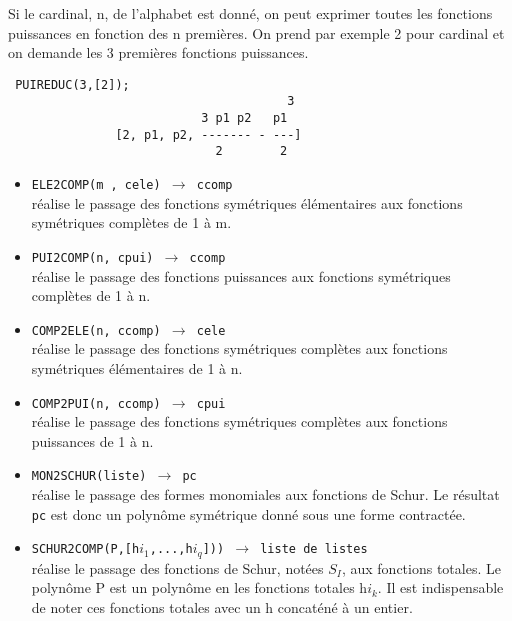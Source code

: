Si le cardinal, n, de l'alphabet est donn\'{e}, on peut
exprimer toutes les fonctions puissances en fonction des n premi\`{e}res.
On prend par exemple 2 pour cardinal et on demande les 3 premi\`{e}res
fonctions puissances.
\small
\begin{verbatim}
 PUIREDUC(3,[2]);
                                       3
                           3 p1 p2   p1
               [2, p1, p2, ------- - ---]
                             2        2

\end{verbatim}
\normalsize
\begin{itemize}
\item {\tt ELE2COMP(m , cele) 
 $\longrightarrow$ ccomp}\\
 r\'{e}alise le passage des fonctions 
sym\'{e}triques 
\'{e}l\'{e}mentaires aux fonctions sym\'etriques compl\`etes de 1 \`{a} m.
\item {\tt PUI2COMP(n, cpui) 
$\longrightarrow$ ccomp}\\
 r\'{e}alise le passage des fonctions 
puissances aux fonctions 
sym\'{e}triques compl\`etes de 1 \`{a} n.
\item {\tt COMP2ELE(n, ccomp) 
$\longrightarrow$ cele}\\
 r\'{e}alise le passage des fonctions sym\'etriques
compl\`etes aux fonctions 
sym\'{e}triques \'{e}l\'{e}mentaires de 1 \`{a} n.
\item {\tt COMP2PUI(n, ccomp)
 $\longrightarrow$ cpui}\\
 r\'{e}alise le passage des fonctions sym\'etriques
compl\`etes aux fonctions 
puissances de 1 \`{a} n.
\item {\tt MON2SCHUR(liste) 
$\longrightarrow$ pc}\\
r\'ealise le passage des formes monomiales aux fonctions de Schur. Le
r\'esultat {\tt pc} est donc un polyn\^ome sym\'etrique donn\'e sous
une forme contract\'ee.

\item {\tt SCHUR2COMP(P,[h$i_{1}$,...,h$i_{q}$]))
$\longrightarrow$ liste de listes}\\
r\'ealise le passage des fonctions de Schur, not\'ees $S_{I}$,
aux fonctions totales. Le polyn\^ome P est un polyn\^ome en les fonctions
totales h$i_{k}$. Il est indispensable de noter ces fonctions totales
avec un h concat\'en\'e \`a un entier.

\end{itemize}

